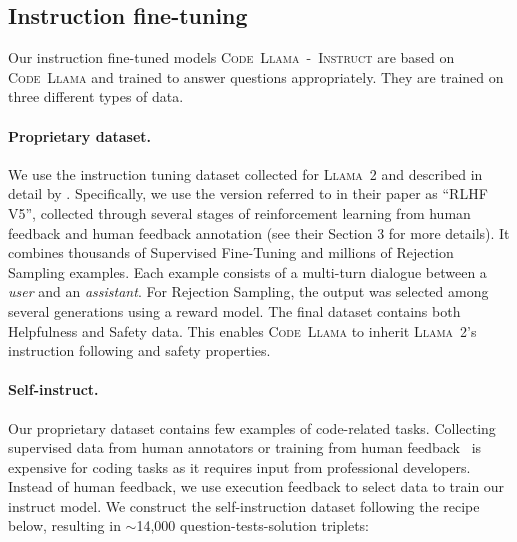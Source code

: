 \subsection{Instruction fine-tuning}
\label{sec:instruct}

Our instruction fine-tuned models \textsc{Code~Llama~-~Instruct} are based on \textsc{Code~Llama} and trained to answer questions appropriately. They are trained on three different types of data.

\paragraph{Proprietary dataset.} We use the instruction tuning dataset collected for \textsc{Llama~2} and described in detail by \citet{touvron2023llamav2}. Specifically, we use the version referred to in their paper as ``RLHF V5'',  collected through several stages of reinforcement learning from human feedback and human feedback annotation  (see their Section 3 for more details). It combines thousands of Supervised Fine-Tuning and millions of Rejection Sampling examples. Each example consists of a multi-turn  dialogue between a \emph{user} and an \emph{assistant}. For Rejection Sampling, the output was selected among several generations using a reward model. The final dataset contains both Helpfulness and Safety data. This enables \textsc{Code~Llama} to inherit \textsc{Llama~2}'s instruction following and safety properties.

\paragraph{Self-instruct.}
Our proprietary dataset contains few examples of code-related tasks. Collecting supervised data from human annotators or training from human feedback~\citep{ouyang2022training} is expensive for coding tasks as it requires input from professional developers. Instead of human feedback, we use execution feedback to select data to train our instruct model. We construct the self-instruction dataset following the recipe below, resulting in $\sim$14,000 question-tests-solution triplets:


